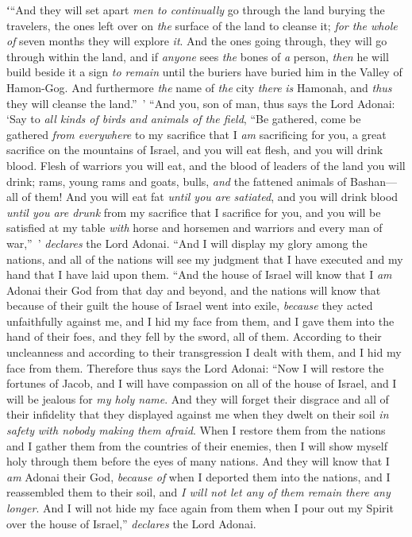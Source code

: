 \begin{biblechapter}
\verse ʻ“And they will set apart \textit{men to continually} go through the land burying the travelers, the ones left over on \textit{the} surface of the land to cleanse it; \textit{for the whole of} seven months they will explore \textit{it}.
\verse And the ones going through, they will go through within the land, and if \textit{anyone} sees \textit{the} bones of \textit{a} person, \textit{then} he will build beside it a sign \textit{to remain} until the buriers have buried him in the Valley of Hamon-Gog.
\verse And furthermore \textit{the} name of \textit{the} city \textit{there} \textit{is} Hamonah, and \textit{thus} they will cleanse the land.” ’
\verse “And you, son of man, thus says the Lord Adonai: ‘Say to \textit{all kinds of birds and animals of the field}, “Be gathered, come be gathered \textit{from everywhere} to my sacrifice that I \textit{am} sacrificing for you, a great sacrifice on the mountains of Israel, and you will eat flesh, and you will drink blood.
\verse Flesh of warriors you will eat, and the blood of leaders of the land you will drink; rams, young rams and goats, bulls, \textit{and} the fattened animals of Bashan—all of them!
\verse And you will eat fat \textit{until you are satiated}, and you will drink blood \textit{until you are drunk} from my sacrifice that I sacrifice for you,
\verse and you will be satisfied at my table \textit{with} horse and horsemen and warriors and every man of war,” ’ \textit{declares} the Lord Adonai.
\verse “And I will display my glory among the nations, and all of the nations will see my judgment that I have executed and my hand that I have laid upon them.
\verse “And the house of Israel will know that I \textit{am} Adonai their God from that day and beyond,
\verse and the nations will know that because of their guilt the house of Israel went into exile, \textit{because} they acted unfaithfully against me, and I hid my face from them, and I gave them into the hand of their foes, and they fell by the sword, all of them.
\verse According to their uncleanness and according to their transgression I dealt with them, and I hid my face from them.
\verse Therefore thus says the Lord Adonai: “Now I will restore the fortunes of Jacob, and I will have compassion on all of the house of Israel, and I will be jealous for \textit{my holy name}.
\verse And they will forget their disgrace and all of their infidelity that they displayed against me when they dwelt on their soil \textit{in safety} \textit{with nobody making them afraid}.
\verse When I restore them from the nations and I gather them from the countries of their enemies, then I will show myself holy through them before the eyes of many nations.
\verse And they will know that I \textit{am} Adonai their God, \textit{because of} when I deported them into the nations, and I reassembled them to their soil, and \textit{I will not let any of them remain there any longer}.
\verse And I will not hide my face again from them when I pour out my Spirit over the house of Israel,” \textit{declares} the Lord Adonai.
\end{biblechapter}

